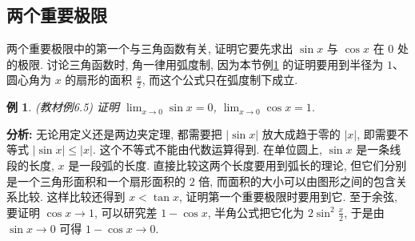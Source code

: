 \documentclass[UTF8,openany]{ctexbook}
\theoremstyle{chinesetextbook}
\newtheorem{example}{例}[section]
\begin{document}
\subsection{两个重要极限}
两个重要极限中的第一个与三角函数有关, 证明它要先求出 $\sin x$ 与 $\cos x$ 在 $0$ 处的极限. 讨论三角函数时, 角一律用弧度制, 因为本节例\ref{ex:6-5} 的证明要用到半径为 $1$、圆心角为 $x$ 的扇形的面积 $\displaystyle\frac x2$, 而这个公式只在弧度制下成立.
\begin{example}\label{ex:6-5}
\textnormal{(教材例6.5)} 证明 $\displaystyle\lim_{x\to0}\sin x=0$, $\displaystyle\lim_{x\to0}\cos x=1$.
\end{example}
\par\indent\textbf{分析:} 无论用定义还是两边夹定理, 都需要把 $|\sin x|$ 放大成趋于零的 $|x|$, 即需要不等式 $|\sin x|\le|x|$. 这个不等式不能由代数运算得到. 在单位圆上, $\sin x$ 是一条线段的长度, $x$ 是一段弧的长度. 直接比较这两个长度要用到弧长的理论, 但它们分别是一个三角形面积和一个扇形面积的 $2$ 倍, 而面积的大小可以由图形之间的包含关系比较. 这样比较还得到 $x<\tan x$, 证明第一个重要极限时要用到它. 至于余弦, 要证明 $\cos x\to1$, 可以研究差 $1-\cos x$, 半角公式把它化为 $\displaystyle2\sin^2\frac x2$, 于是由 $\sin x\to0$ 可得 $1-\cos x\to0$.
\end{document}
